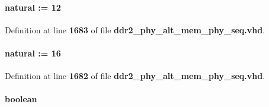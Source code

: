 \paragraph[{c\+\_\+max\+\_\+mode\+\_\+reg\+\_\+bit}]{ {\bfseries \textcolor{comment}{natural}\textcolor{vhdlchar}{ }\textcolor{vhdlchar}{ }\textcolor{vhdlchar}{\+:}\textcolor{vhdlchar}{=}\textcolor{vhdlchar}{ }\textcolor{vhdlchar}{ } \textcolor{vhdldigit}{12} \textcolor{vhdlchar}{ }} \hspace{0.3cm}{\ttfamily [Constant]}}\label{classddr2__phy__alt__mem__phy__addr__cmd__pkg_acb6c6e90e0286accb34c78f57c2115f8}


Definition at line {\bf 1683} of file {\bf ddr2\+\_\+phy\+\_\+alt\+\_\+mem\+\_\+phy\+\_\+seq.\+vhd}.

\paragraph[{c\+\_\+max\+\_\+ranks}]{ {\bfseries \textcolor{comment}{natural}\textcolor{vhdlchar}{ }\textcolor{vhdlchar}{ }\textcolor{vhdlchar}{\+:}\textcolor{vhdlchar}{=}\textcolor{vhdlchar}{ }\textcolor{vhdlchar}{ } \textcolor{vhdldigit}{16} \textcolor{vhdlchar}{ }} \hspace{0.3cm}{\ttfamily [Constant]}}\label{classddr2__phy__alt__mem__phy__addr__cmd__pkg_a4d1af56ebabe8419a6ffc2af62b2f3ba}


Definition at line {\bf 1682} of file {\bf ddr2\+\_\+phy\+\_\+alt\+\_\+mem\+\_\+phy\+\_\+seq.\+vhd}.

\paragraph[{cas\+\_\+n}]{ {\bfseries \textcolor{comment}{boolean}\textcolor{vhdlchar}{ }} \hspace{0.3cm}{\ttfamily [Record]}}\label{classddr2__phy__alt__mem__phy__addr__cmd__pkg_a9c31dbee34d89788a44b7c1d86f99cef}


